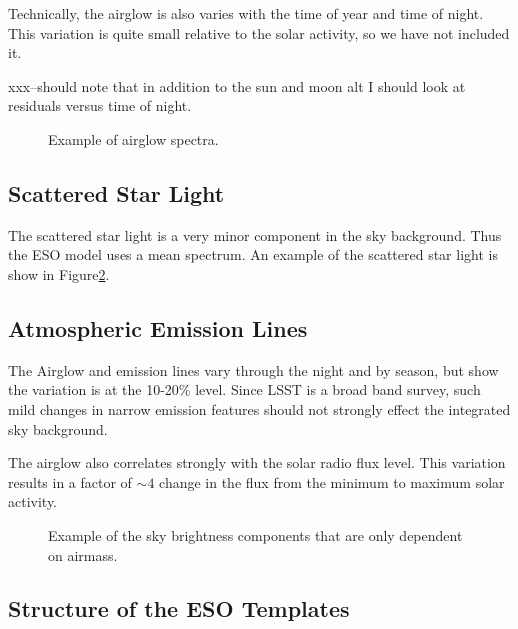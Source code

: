 \documentclass{emulateapj}  %
\begin{document}
{Technically, the airglow is also varies with the time of year and time of night.  This variation is quite small relative to the solar activity\citet{Noll12}, so we have not included it.

xxx--should note that in addition to the sun and moon alt I should look at residuals versus time of night.

\begin{figure}
  \caption{Example of airglow spectra. \label{fig:airglow}}
\end{figure}

  

\subsection{Scattered Star Light}

The scattered star light is a very minor component in the sky background. Thus the ESO model uses a mean spectrum.  An example of the scattered star light is show in Figure\ref{fig:merged}.


\subsection{Atmospheric Emission Lines}

The Airglow and emission lines vary through the night and by season, but \citet{Noll12} show the variation is at the 10-20\% level.  Since LSST is a broad band survey, such mild changes in narrow emission features should not strongly effect the integrated sky background.

The airglow also correlates strongly with the solar radio flux level.  This variation results in a factor of $\sim4$ change in the flux from the minimum to maximum solar activity.  


\begin{figure}
  \caption{Example of the sky brightness components that are only dependent on airmass.  \label{fig:merged}}
\end{figure}



\subsection{Structure of the ESO Templates}

}
\end{document}
